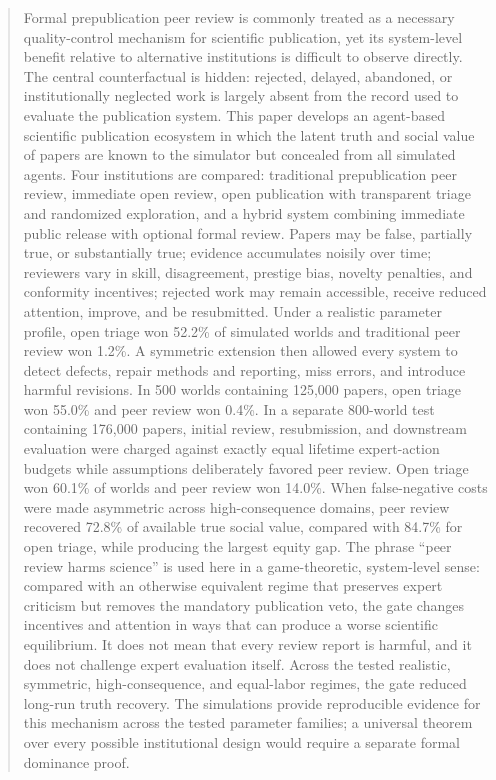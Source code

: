 \maketitle

\begin{abstract}
Formal prepublication peer review is commonly treated as a necessary quality-control mechanism for scientific publication, yet its system-level benefit relative to alternative institutions is difficult to observe directly. The central counterfactual is hidden: rejected, delayed, abandoned, or institutionally neglected work is largely absent from the record used to evaluate the publication system. This paper develops an agent-based scientific publication ecosystem in which the latent truth and social value of papers are known to the simulator but concealed from all simulated agents. Four institutions are compared: traditional prepublication peer review, immediate open review, open publication with transparent triage and randomized exploration, and a hybrid system combining immediate public release with optional formal review. Papers may be false, partially true, or substantially true; evidence accumulates noisily over time; reviewers vary in skill, disagreement, prestige bias, novelty penalties, and conformity incentives; rejected work may remain accessible, receive reduced attention, improve, and be resubmitted. Under a realistic parameter profile, open triage won 52.2\% of simulated worlds and traditional peer review won 1.2\%. A symmetric extension then allowed every system to detect defects, repair methods and reporting, miss errors, and introduce harmful revisions. In 500 worlds containing 125,000 papers, open triage won 55.0\% and peer review won 0.4\%. In a separate 800-world test containing 176,000 papers, initial review, resubmission, and downstream evaluation were charged against exactly equal lifetime expert-action budgets while assumptions deliberately favored peer review. Open triage won 60.1\% of worlds and peer review won 14.0\%. When false-negative costs were made asymmetric across high-consequence domains, peer review recovered 72.8\% of available true social value, compared with 84.7\% for open triage, while producing the largest equity gap. The phrase ``peer review harms science'' is used here in a game-theoretic, system-level sense: compared with an otherwise equivalent regime that preserves expert criticism but removes the mandatory publication veto, the gate changes incentives and attention in ways that can produce a worse scientific equilibrium. It does not mean that every review report is harmful, and it does not challenge expert evaluation itself. Across the tested realistic, symmetric, high-consequence, and equal-labor regimes, the gate reduced long-run truth recovery. The simulations provide reproducible evidence for this mechanism across the tested parameter families; a universal theorem over every possible institutional design would require a separate formal dominance proof.
\end{abstract}


